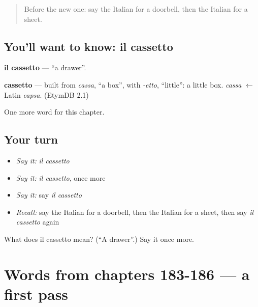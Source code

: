 \label{lesson:IT-C191-cassetto}



\begin{quote}
Before the new one: say the Italian for a doorbell, then the Italian for a sheet.
\end{quote}

\subsection*{You'll want to know: il cassetto}
\textbf{il cassetto} — \textquotedblleft{}a drawer\textquotedblright{}.

\begin{cousinweb}
\textbf{cassetto} — built from \emph{cassa}, \textquotedblleft{}a box\textquotedblright{}, with \emph{-etto}, \textquotedblleft{}little\textquotedblright{}: a little box. \emph{cassa} $\leftarrow$ Latin \emph{capsa}. (EtymDB 2.1)
\end{cousinweb}

\begin{grammarlens}[title={What you've built}]
One more word for this chapter.
\end{grammarlens}

\subsection*{Your turn}
\begin{itemize}
\raggedright
  \item \emph{Say it:} \emph{il cassetto}
  \item \emph{Say it:} \emph{il cassetto}, once more
  \item \emph{Say it:} say \emph{il cassetto}
  \item \emph{Recall:} say the Italian for a doorbell, then the Italian for a sheet, then say \emph{il cassetto} again
\end{itemize}

\begin{tcolorbox}[breakable,colback=teal!4,colframe=teal!35!black,title={Before you move on}]
What does il cassetto mean? (\textquotedblleft{}A drawer\textquotedblright{}.) Say it once more.
\end{tcolorbox}
\section[(dialogue)]{Words from chapters 183-186 — a first pass}

\label{lesson:IT-R191-first-pass-words-from-chapters-183-186}



